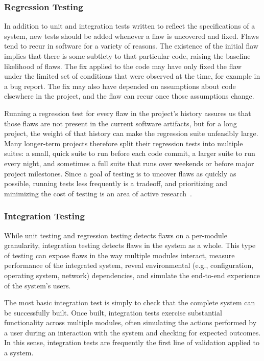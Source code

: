 \subsubsection{Regression Testing}

In addition to unit and integration tests written to reflect the
specifications of a system, new tests should be added whenever a flaw
is uncovered and fixed. Flaws tend to recur in software for a variety
of reasons. The existence of the initial flaw implies that there is
some subtlety to that particular code, raising the baseline likelihood
of flaws. The fix applied to the code may have only fixed the flaw
under the limited set of conditions that were observed at the time,
for example in a bug report. The fix may also have depended on
assumptions about code elsewhere in the project, and the flaw can
recur once those assumptions change.

Running a regression test for every flaw in the project's history
assures us that those flaws are not present in the current software
artifacts, but for a long project, the weight of that history can make
the regression suite unfeasibly large. Many longer-term projects
therefore split their regression tests into multiple suites: a small,
quick suite to run before each code commit, a larger suite to run
every night, and sometimes a full suite that runs over weekends or
before major project milestones. Since a goal of testing is to uncover
flaws as quickly as possible, running tests less frequently is a
tradeoff, and prioritizing and minimizing the cost of testing is an
area of active research~\cite{yoo2012regression}.

\subsubsection{Integration Testing}

While unit testing and regression testing detects flaws on a
per-module granularity, integration testing detects flaws in the
system as a whole. This type of testing can expose flaws in the way
multiple modules interact, measure performance of the integrated
system, reveal environmental (e.g., configuration, operating system,
network) dependencies, and simulate the end-to-end experience of the
system's users.

The most basic integration test is simply to check that the complete
system can be successfully built. Once built, integration tests
exercise substantial functionality across multiple modules, often
simulating the actions performed by a user during an interaction with
the system and checking for expected outcomes. In this sense,
integration tests are frequently the first line of validation applied
to a system.

